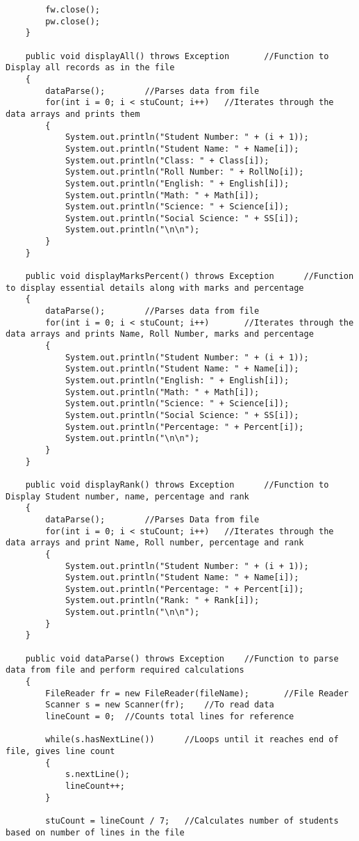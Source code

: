 \documentclass[ProgramminAssignment.tex]{subfiles}
\begin{document}
\begin{lstlisting}
		fw.close();
		pw.close();
	}
	
	public void displayAll() throws Exception		//Function to Display all records as in the file
	{
		dataParse();		//Parses data from file
		for(int i = 0; i < stuCount; i++)	//Iterates through the data arrays and prints them
		{
			System.out.println("Student Number: " + (i + 1));
			System.out.println("Student Name: " + Name[i]);
			System.out.println("Class: " + Class[i]);
			System.out.println("Roll Number: " + RollNo[i]);
			System.out.println("English: " + English[i]);
			System.out.println("Math: " + Math[i]);
			System.out.println("Science: " + Science[i]);
			System.out.println("Social Science: " + SS[i]);
			System.out.println("\n\n");
		}	
	}
	
	public void displayMarksPercent() throws Exception		//Function to display essential details along with marks and percentage
	{
		dataParse();		//Parses data from file
		for(int i = 0; i < stuCount; i++)		//Iterates through the data arrays and prints Name, Roll Number, marks and percentage
		{
			System.out.println("Student Number: " + (i + 1));
			System.out.println("Student Name: " + Name[i]);
			System.out.println("English: " + English[i]);
			System.out.println("Math: " + Math[i]);
			System.out.println("Science: " + Science[i]);
			System.out.println("Social Science: " + SS[i]);
			System.out.println("Percentage: " + Percent[i]);
			System.out.println("\n\n");
		}	
	}
	
	public void displayRank() throws Exception		//Function to Display Student number, name, percentage and rank
	{	
		dataParse();		//Parses Data from file
		for(int i = 0; i < stuCount; i++)	//Iterates through the data arrays and print Name, Roll number, percentage and rank
		{
			System.out.println("Student Number: " + (i + 1));
			System.out.println("Student Name: " + Name[i]);
			System.out.println("Percentage: " + Percent[i]);
			System.out.println("Rank: " + Rank[i]);
			System.out.println("\n\n");
		}	
	}
	
	public void dataParse() throws Exception	//Function to parse data from file and perform required calculations
	{
		FileReader fr = new FileReader(fileName);		//File Reader
		Scanner s = new Scanner(fr);	//To read data
		lineCount = 0;	//Counts total lines for reference
			
		while(s.hasNextLine())		//Loops until it reaches end of file, gives line count
		{
			s.nextLine();
			lineCount++;
		}
		
		stuCount = lineCount / 7;	//Calculates number of students based on number of lines in the file
		

\end{lstlisting}
\end{document}
